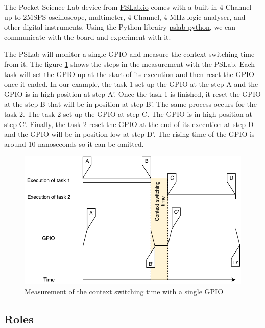 The Pocket Science Lab device from \href{https://pslab.io}{PSLab.io} comes with a built-in 4-Channel up to 2MSPS oscilloscope, multimeter, 4-Channel, 4 MHz logic analyser, and other digital instruments.
Using the Python librairy \href{https://github.com/fossasia/pslab-python}{pslab-python}, we can communicate with the board and experiment with it.

The PSLab will monitor a single GPIO and measure the context switching time from it.
The figure \ref{fig:external-framework-context-switching-time-measurement} shows the steps in the measurement with the PSLab.
Each task will set the GPIO up at the start of its execution and then reset the GPIO once it ended.
In our example, the task 1 set up the GPIO at the step A and the GPIO is in high position at step A'.
Once the task 1 is finished, it reset the GPIO at the step B that will be in position at step B'.
The same process occurs for the task 2.
The task 2 set up the GPIO at step C.
The GPIO is in high position at step C'.
Finally, the task 2 reset the GPIO at the end of its execution at step D and the GPIO will be in position low at step D'.
The rising time of the GPIO is around 10 nanoseconds so it can be omitted.

\begin{figure}[!ht]
  \centering
  \includegraphics[scale=1]{assets/external-framework-context-switching-time-measurement.pdf}
  \caption{\label{fig:external-framework-context-switching-time-measurement}Measurement of the context switching time with a single GPIO}
\end{figure}

\subsection{Roles}


